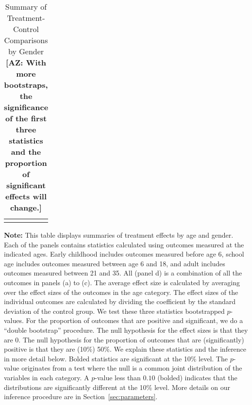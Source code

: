 \begin{table}[!htpb]
\begin{threeparttable}
\caption{Summary of Treatment-Control Comparisons by Gender \textbf{[AZ: With more bootstraps, the significance  of the first three statistics and the proportion of significant effects will change.]}} \label{table:summary}
\centering 
\begin{tabularx}{16.5cm}{XcX}
&  & 
\end{tabularx}
\begin{tablenotes}
\footnotesize
\item \textbf{Note:} This table displays summaries of treatment effects by age and gender. Each of the panels contains statistics calculated using outcomes measured at the indicated ages. Early childhood includes outcomes measured before age 6, school age includes outcomes measured between age 6 and 18, and adult includes outcomes measured between 21 and 35. All (panel d) is a combination of all the outcomes in panels (a) to (c). The average effect size is calculated by averaging over the effect sizes of the outcomes in the age category. The effect sizes of the individual outcomes are calculated by dividing the coefficient by the standard deviation of the control group. We test these three statistics bootstrapped $p$-values. For the proportion of outcomes that are positive and significant, we do a ``double bootstrap'' procedure. The null hypothesis for the effect sizes is that they are 0. The null hypothesis for the proportion of outcomes that are (significantly) positive is that they are (10\%) 50\%. We explain these statistics and the inference in more detail below. Bolded statistics are significant at the 10\% level. The \citet{Rosenbaum_2005_Distribution_JRSS} $p$-value originates from a test where the null is a common joint distribution of the variables in each category. A $p$-value less than $0.10$ (bolded) indicates that the distributions are significantly different at the 10\% level. More details on our inference procedure are in Section~\ref{sec:parameters}.
\end{tablenotes}
\end{threeparttable}
\end{table}

